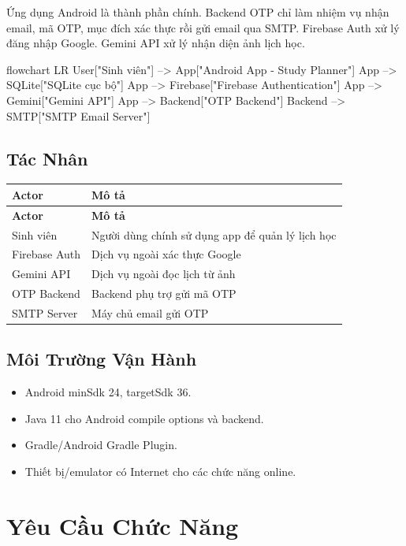 \documentclass[12pt,a4paper]{report}
\begin{document}
Ứng dụng Android là thành phần chính. Backend OTP chỉ làm nhiệm vụ nhận email, mã OTP, mục đích xác thực rồi gửi email qua SMTP. Firebase Auth xử lý đăng nhập Google. Gemini API xử lý nhận diện ảnh lịch học.

\begin{CodeBlock}
flowchart LR
    User["Sinh viên"] --> App["Android App - Study Planner"]
    App --> SQLite["SQLite cục bộ"]
    App --> Firebase["Firebase Authentication"]
    App --> Gemini["Gemini API"]
    App --> Backend["OTP Backend"]
    Backend --> SMTP["SMTP Email Server"]
\end{CodeBlock}

\subsection{Tác Nhân}

\begin{longtable}{|>{\raggedright\arraybackslash}p{}|>{\raggedright\arraybackslash}p{}|}
\hline
\textbf{Actor} & \textbf{Mô tả} \\ \hline
\endfirsthead
\hline
\textbf{Actor} & \textbf{Mô tả} \\ \hline
\endhead
Sinh viên & Người dùng chính sử dụng app để quản lý lịch học \\ \hline
Firebase Auth & Dịch vụ ngoài xác thực Google \\ \hline
Gemini API & Dịch vụ ngoài đọc lịch từ ảnh \\ \hline
OTP Backend & Backend phụ trợ gửi mã OTP \\ \hline
SMTP Server & Máy chủ email gửi OTP \\ \hline
\end{longtable}

\subsection{Môi Trường Vận Hành}

\begin{itemize}
\item Android minSdk 24, targetSdk 36.
\item Java 11 cho Android compile options và backend.
\item Gradle/Android Gradle Plugin.
\item Thiết bị/emulator có Internet cho các chức năng online.
\end{itemize}

\section{Yêu Cầu Chức Năng}
\end{document}
